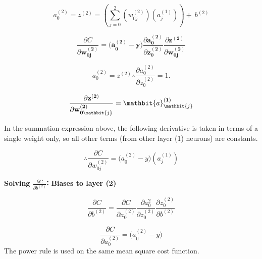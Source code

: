 \documentclass[12pt,a4paper]{article}
\begin{document}
\begin{equation}
a_0^{\left(2\right)}=z^{\left(2\right)}=\left(\sum_{j=0}^{2}\left(w_{0j}^{\left(2\right)}\right)\left(a_j^{\left(1\right)}\right)\right)+\ b^{\left(2\right)}
\end{equation}	

\begin{equation}
    \frac{\partial C}{\partial\mathbf{w}_{\mathbf{0j}}^{\left(\mathbf{2}\right)}}={(\mathbf{a}}_\mathbf{0}^{\left(\mathbf{2}\right)}-\mathbf{y})\frac{\partial\mathbf{a}_\mathbf{0}^{(\mathbf{2})}}{\partial\mathbf{z}_\mathbf{0}^{\left(\mathbf{2}\right)}}\frac{\partial\mathbf{z}^{\left(\mathbf{2}\right)}}{\partial\mathbf{w}_{\mathbf{0j}}^{\left(\mathbf{2}\right)}}
\end{equation}

	
\begin{equation}
a_0^{\left(2\right)}= z^{\left(2\right)} 
\therefore \frac{\partial a_0^{(2)}}{\partial z_0^{\left(2\right)}} = 1.
\end{equation}	

	
	
\begin{equation}
\frac{\partial\mathbf{z}^{\left(\mathbf{2}\right)}}{\partial\mathbf{w}_{\mathbf{0}\mathbit{j}}^{\left(\mathbf{2}\right)}}=\mathbit{a}_\mathbit{j}^{\left(\mathbf{1}\right)}
\end{equation}	

In the summation expression above, the following derivative is taken in terms of a single weight only, so all other terms (from other layer (1) neurons) are constants.

\begin{equation}
\boxed{\therefore\frac{\partial C}{\partial w_{0j}^{\left(2\right)}}={(a}_0^{\left(2\right)}-y)(a_j^{\left(1\right)})}
\end{equation}	


\textbf{Solving $\frac{\partial C}{\partial b^{\left(2\right)}}$∶ Biases to layer (2)}


\begin{equation}
\frac{\partial C}{\partial b^{\left(2\right)}}=\frac{\partial C}{\partial a_0^{(2)}}\frac{\partial a_0^2}{\partial z_0^{\left(2\right)}}\frac{\partial z_0^{\left(2\right)}}{\partial b^{\left(2\right)}}
\end{equation}	


	
\begin{equation}
\frac{\partial C}{\partial a_0^{\left(2\right)}}={(a}_0^{\left(2\right)}-y)
\end{equation}	
The power rule is used on the same mean square cost function.
\end{document}

